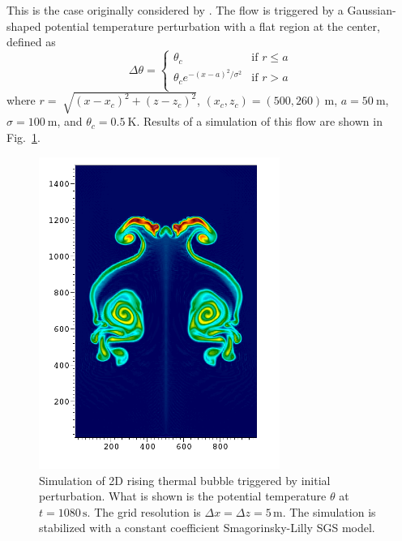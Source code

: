 \documentclass{report}
\begin{document}
This is the case originally considered by \cite{robert1993}. The flow is triggered by a Gaussian-shaped potential temperature perturbation with a flat region at the center, defined as
\begin{equation}
 \Delta\theta = \left\{ \begin{array}{ll}
 \theta_c & \text{if } r \leq a\\
 \theta_c e^{-(x - a)^2/\sigma^2} & \text{if } r > a\\
\end{array} \right.
\label{eq:robertIni}
\end{equation}
where $r = \sqrt[]{(x-x_{c})^{2} + (z-z_{c})^{2}}$, $(x_c,z_c) = (500,260)\,\mathrm{m}$, $a=50~\mathrm{m}$, $\sigma = 100~\mathrm{m}$, and $\theta_c=0.5~\mathrm{K}$. Results of a simulation of this flow are shown in Fig.~\ref{fig:benchmarks/robert_bubble}.
\begin{figure}
\centerline{\includegraphics[width=0.7\textwidth]{figures/RTB-Robert--smgo-5mX5m-1080s0000.png}}
\caption{Simulation of 2D rising thermal bubble triggered by initial perturbation. What is shown is the potential temperature $\theta$ at $t=1080\,\mathrm{s}$. The grid resolution is $\Delta x = \Delta z = 5\,\mathrm{m}$.  The simulation is stabilized with a constant coefficient Smagorinsky-Lilly SGS model.}
\label{fig:benchmarks/robert_bubble}
\end{figure}
\end{document}
